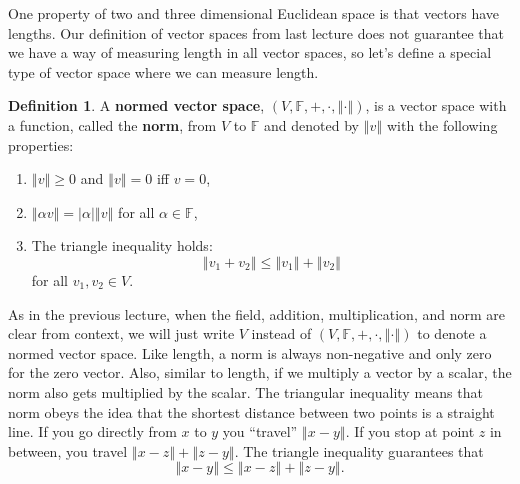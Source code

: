 \documentclass[12pt,reqno]{amsart}
\theoremstyle{definition}
\newtheorem{definition}{Definition}[section]
\def\F{\mathbb{F}}
\newcommand{\norm}[1]{\left\Vert {#1} \right\Vert}
\begin{document}
One property of two and three dimensional Euclidean space is that
vectors have lengths. Our definition of vector spaces from last
lecture does not guarantee that we have a way of measuring length in
all vector spaces, so let's define a special type of vector space
where we can measure length.
\begin{definition}
  A \textbf{normed vector space}, $(V,\F,+,\cdot, \norm{\cdot})$, is a
  vector space with a function, called the \textbf{norm}, from $V$ to
  $\F$ and denoted by $\norm{v}$ with the following properties:
  \begin{enumerate}
  \item $\norm{v} \geq 0$ and $\norm{v} = 0$ iff $v = 0$,
  \item $\norm{\alpha v} = |\alpha|\norm{v}$ for all $\alpha \in \F$,
  \item The triangle inequality holds:
    \[ \norm{v_1+v_2} \leq \norm{v_1} + \norm{v_2} \]
    for all $v_1, v_2 \in V$.
  \end{enumerate}
\end{definition}
As in the previous lecture, when the field, addition, multiplication,
and norm are clear from context, we will just write $V$ instead of
$(V,\F,+,\cdot, \norm{\cdot})$ to denote a normed vector space. 
Like length, a norm is always non-negative and only zero for the zero
vector. Also, similar to length, if we multiply a vector by a scalar,
the norm also gets multiplied by the scalar. The triangular inequality
means that norm obeys the idea that the shortest distance between two
points is a straight line. If you go directly from $x$ to $y$ you
``travel'' $\norm{x - y}$. If you stop at point $z$ in between, you travel
$\norm{x - z} + \norm{z - y}$. The triangle inequality guarantees that 
\[ \norm{x-y} \leq \norm{x - z} + \norm{z - y}. \]
\end{document}
